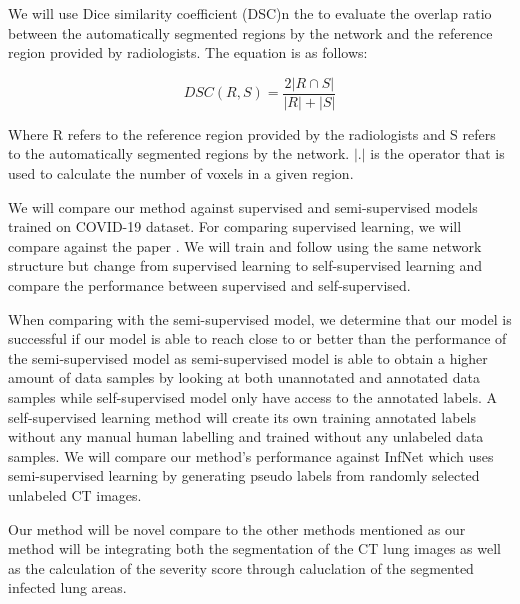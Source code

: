 We will use Dice similarity coefficient (DSC)n the  to evaluate the overlap ratio between the automatically segmented regions by the network and the reference region provided by radiologists. The equation is as follows:

\begin{equation}
DSC(R,S)=\frac{2|R\cap S|}{|R|+|S|}
\end{equation}

Where R refers to the reference region provided by the radiologists and S refers to the automatically segmented regions by the network. $|.|$
is the operator that is used to calculate the number of voxels in a given region.

We will compare our method against supervised and semi-supervised \cite{ref13,ref14} models trained on COVID-19 dataset. For comparing supervised learning, we will compare against the paper \cite{ref13}. We will train and follow using the same network structure but change from supervised learning to self-supervised learning and compare the performance between supervised and self-supervised.

When comparing with the semi-supervised model, we determine that our model is successful if our model is able to reach close to or better than the performance of the semi-supervised model as semi-supervised model is able to obtain a higher amount of data samples by looking at both unannotated and annotated data samples while self-supervised model only have access to the annotated labels. A self-supervised learning method will create its own training annotated labels without any manual human labelling and trained without any unlabeled data samples. We will compare our method’s performance against InfNet \cite{ref14} which uses semi-supervised learning by generating pseudo labels from randomly selected unlabeled CT images.

Our method will be novel compare to the other methods mentioned as our method will be integrating both the segmentation of the CT lung images as well as the calculation of the severity score through caluclation of the segmented infected lung areas.

